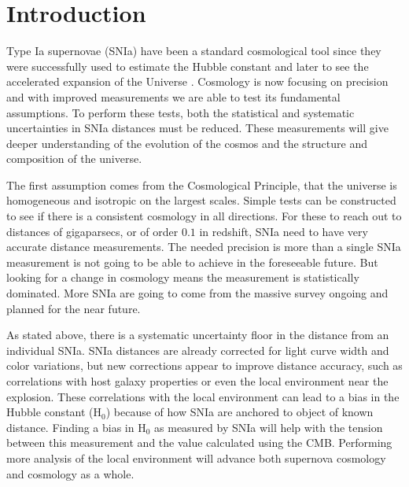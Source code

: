\documentclass[apj, iop]{emulateapj}
\newcommand{\sn}{SNIa}
\newcommand{\Hubble}{\ensuremath{\text{H}_0}}
\begin{document}
\maketitle

\section{Introduction}\label{introduction} 

Type Ia supernovae (\sn{}) have been a standard cosmological tool since they
were successfully used to estimate the Hubble constant \citep{Hamuy95,Riess95}
and later to see the accelerated expansion of the Universe
\citep{Riess98,Perlmutter99}. Cosmology is now focusing on precision and with
improved measurements we are able to test its fundamental assumptions. To
perform these tests, both the statistical and systematic uncertainties in \sn{}
distances must be reduced. These measurements will give deeper understanding of
the evolution of the cosmos and the structure and composition of the universe.

The first assumption comes from the Cosmological Principle, that the universe is
homogeneous and isotropic on the largest scales. Simple tests can be constructed
to see if there is a consistent cosmology in all directions. For these to reach
out to distances of gigaparsecs, or of order $0.1$ in redshift, \sn{} need to
have very accurate distance measurements. The needed precision is more than a
single \sn{} measurement is not going to be able to achieve in the foreseeable
future. But looking for a change in cosmology means the measurement is
statistically dominated. More \sn{} are going to come from the massive survey
ongoing and planned for the near future.


As stated above, there is a systematic uncertainty floor in the distance from an
individual \sn{}. \sn{} distances are already corrected for light curve width
and color variations, but new corrections appear to improve distance
accuracy, such as correlations with host galaxy properties or even the local
environment near the explosion. These correlations with the local environment
can lead to a bias in the Hubble constant (\Hubble{}) because of how \sn{} are
anchored to object of known distance. Finding a bias in \Hubble{} as measured by
\sn{} will help with the tension between this measurement and the value
calculated using the CMB. Performing more analysis of the local environment will
advance both supernova cosmology and cosmology as a whole.
\end{document}
